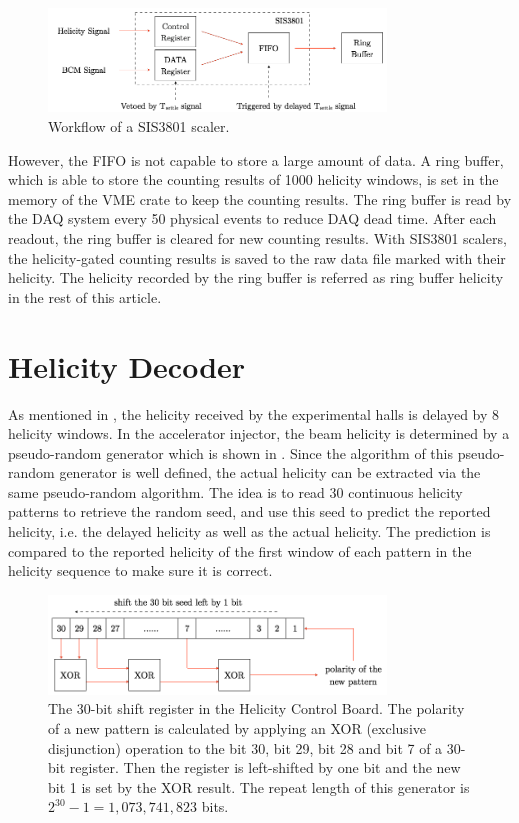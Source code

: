 \begin{figure}[tb!]
  \centering
  \includegraphics[width=0.8\textwidth]{figs/sis3801.png}
  \caption{Workflow of a SIS3801 scaler. \label{A2S1F1}}
\end{figure}

However, the FIFO is not capable to store a large amount of data. A ring buffer, which is able to store the counting results of 1000 helicity windows, is set in the memory of the VME crate to keep the counting results. The ring buffer is read by the DAQ system every 50 physical events to reduce DAQ dead time. After each readout, the ring buffer is cleared for new counting results. With SIS3801 scalers, the helicity-gated counting results is saved to the raw data file marked with their helicity. The helicity recorded by the ring buffer is referred as ring buffer helicity in the rest of this article.

\section{Helicity Decoder}
\label{A2S2}

As mentioned in , the helicity received by the experimental halls is delayed by 8 helicity windows. In the accelerator injector, the beam helicity is determined by a pseudo-random generator which is shown in . Since the algorithm of this pseudo-random generator is well defined, the actual helicity can be extracted via the same pseudo-random algorithm. The idea is to read 30 continuous helicity patterns to retrieve the random seed, and use this seed to predict the reported helicity, i.e. the delayed helicity as well as the actual helicity. The prediction is compared to the reported helicity of the first window of each pattern in the helicity sequence to make sure it is correct.

\begin{figure}[b!]
  \centering
  \includegraphics[width=0.8\textwidth]{figs/helicity-pseudo-random.png}
  \caption[The pseudo-random generator of the helicity signal.]{The 30-bit shift register in the Helicity Control Board. The polarity of a new pattern is calculated by applying an XOR (exclusive disjunction) operation to the bit 30, bit 29, bit 28 and bit 7 of a 30-bit register. Then the register is left-shifted by one bit and the new bit 1 is set by the XOR result. The repeat length of this generator is $2^{30} - 1 = 1,073,741,823$ bits. \label{A2S2F1}}
\end{figure}


